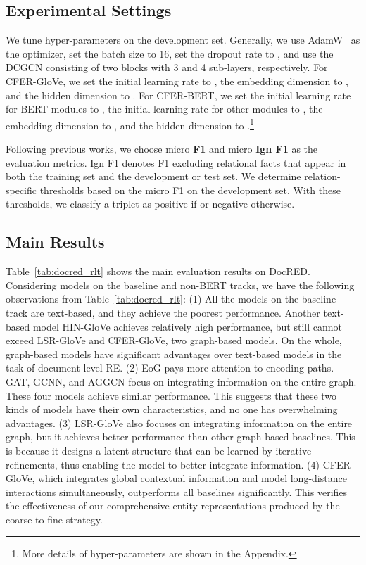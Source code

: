 \documentclass[letterpaper]{article} \usepackage{aaai21}  \usepackage{times}  \usepackage{helvet} \usepackage{courier}  \usepackage[hyphens]{url}  \usepackage{graphicx} \urlstyle{rm} \def\UrlFont{\rm}  \usepackage{natbib}  \usepackage{caption} \frenchspacing  \setlength{\pdfpagewidth}{8.5in}  \setlength{\pdfpageheight}{11in}
\begin{document}
\subsection{Experimental Settings}
We tune hyper-parameters on the development set. 
Generally, we use AdamW~\citep{adamw} as the optimizer, set the batch size to 16, set the dropout rate to , and use the DCGCN consisting of two blocks with 3 and 4 sub-layers, respectively. 
For CFER-GloVe, we set the initial learning rate to , the embedding dimension to , and the hidden dimension to . 
For CFER-BERT, we set the initial learning rate for BERT modules to , the initial learning rate for other modules to , the embedding dimension to , and the hidden dimension to .\footnote{More details of hyper-parameters are shown in the Appendix. }

Following previous works, we choose micro \textbf{F1} and micro \textbf{Ign F1} as the evaluation metrics. 
Ign F1 denotes F1 excluding relational facts that appear in both the training set and the development or test set. 
We determine relation-specific thresholds  based on the micro F1 on the development set. 
With these thresholds, we classify a triplet  as positive if  or negative otherwise. 

\subsection{Main Results}

Table~\ref{tab:docred_rlt} shows the main evaluation results on DocRED. 
Considering models on the baseline and non-BERT tracks, we have the following observations from Table~\ref{tab:docred_rlt}: 
(1) 
All the models on the baseline track are text-based, and they achieve the poorest performance. 
Another text-based model HIN-GloVe achieves relatively high performance, but still cannot exceed LSR-GloVe and CFER-GloVe, two graph-based models. 
On the whole, graph-based models have significant advantages over text-based models in the task of document-level RE. 
(2) 
EoG pays more attention to encoding paths. 
GAT, GCNN, and AGGCN focus on integrating information on the entire graph. 
These four models achieve similar performance. 
This suggests that these two kinds of models have their own characteristics, and no one has overwhelming advantages. 
(3)
LSR-GloVe also focuses on integrating information on the entire graph, but it achieves better performance than other graph-based baselines. 
This is because it designs a latent structure that can be learned by iterative refinements, thus enabling the model to better integrate information. 
(4)
CFER-GloVe, which integrates global contextual information and model long-distance interactions simultaneously, outperforms all baselines significantly. 
This verifies the effectiveness of our comprehensive entity representations produced by the coarse-to-fine strategy. 
\end{document}

